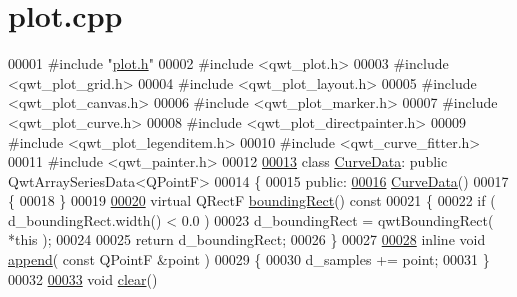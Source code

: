 \hypertarget{plot_8cpp_source}{}\section{plot.\+cpp}
\label{plot_8cpp_source}

\begin{DoxyCode}
00001 \textcolor{preprocessor}{#include "\hyperlink{plot_8h}{plot.h}"}
00002 \textcolor{preprocessor}{#include <qwt\_plot.h>}
00003 \textcolor{preprocessor}{#include <qwt\_plot\_grid.h>}
00004 \textcolor{preprocessor}{#include <qwt\_plot\_layout.h>}
00005 \textcolor{preprocessor}{#include <qwt\_plot\_canvas.h>}
00006 \textcolor{preprocessor}{#include <qwt\_plot\_marker.h>}
00007 \textcolor{preprocessor}{#include <qwt\_plot\_curve.h>}
00008 \textcolor{preprocessor}{#include <qwt\_plot\_directpainter.h>}
00009 \textcolor{preprocessor}{#include <qwt\_plot\_legenditem.h>}
00010 \textcolor{preprocessor}{#include <qwt\_curve\_fitter.h>}
00011 \textcolor{preprocessor}{#include <qwt\_painter.h>}
00012 
\hypertarget{plot_8cpp_source.tex_l00013}{}\hyperlink{classCurveData}{00013} \textcolor{keyword}{class }\hyperlink{classCurveData}{CurveData}: \textcolor{keyword}{public} QwtArraySeriesData<QPointF>
00014 \{
00015 \textcolor{keyword}{public}:
\hypertarget{plot_8cpp_source.tex_l00016}{}\hyperlink{classCurveData_a4e9a1bb778f0cb2e7d573b88163cfd38}{00016}     \hyperlink{classCurveData_a4e9a1bb778f0cb2e7d573b88163cfd38}{CurveData}()
00017     \{
00018     \}
00019 
\hypertarget{plot_8cpp_source.tex_l00020}{}\hyperlink{classCurveData_ab915e8d2a5f879804584908a65c5c7f6}{00020}     \textcolor{keyword}{virtual} QRectF \hyperlink{classCurveData_ab915e8d2a5f879804584908a65c5c7f6}{boundingRect}()\textcolor{keyword}{ const}
00021 \textcolor{keyword}{    }\{
00022         \textcolor{keywordflow}{if} ( d\_boundingRect.width() < 0.0 )
00023             d\_boundingRect = qwtBoundingRect( *\textcolor{keyword}{this} );
00024 
00025         \textcolor{keywordflow}{return} d\_boundingRect;
00026     \}
00027 
\hypertarget{plot_8cpp_source.tex_l00028}{}\hyperlink{classCurveData_aff1e348b77d682b9ea65e7724d5679d5}{00028}     \textcolor{keyword}{inline} \textcolor{keywordtype}{void} \hyperlink{classCurveData_aff1e348b77d682b9ea65e7724d5679d5}{append}( \textcolor{keyword}{const} QPointF &point )
00029     \{
00030         d\_samples += point;
00031     \}
00032 
\hypertarget{plot_8cpp_source.tex_l00033}{}\hyperlink{classCurveData_ae898810872a274a681ab60131ecf922b}{00033}     \textcolor{keywordtype}{void} \hyperlink{classCurveData_ae898810872a274a681ab60131ecf922b}{clear}()

\end{DoxyCode}
